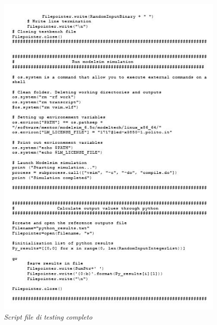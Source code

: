 \begin{figure}[!htb]
	\centering
	\includegraphics[scale=1]{immagini/testing2}
	\caption{\textit{Script file di testing completo}}
	\label{testing2}
\end{figure}
\newpage
